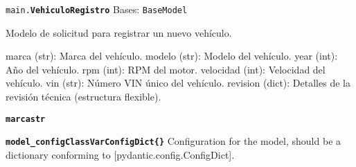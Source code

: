 \documentclass[a4paper,11pt,spanish]{sphinxmanual}
\newcommand{\robotoMonoBold}{\fontseries{b}\selectfont\ttfamily}
\renewcommand{\sphinxcode}[1]{\textcolor{sphinxorangeCode}{{\robotoMonoBold #1}}}
\renewcommand{\sphinxbfcode}[1]{\textbf{\sphinxcode{#1}}}
\renewcommand{\sphinxupquote}[1]{\texttt{#1}}
\begin{document}

\begin{fulllineitems}
\label{\detokenize{modelos:main.VehiculoRegistro}}
\pysigstartsignatures
\pysiglinewithargsret
{\sphinxbfcode{\sphinxupquote{}}\sphinxcode{\sphinxupquote{main.}}\sphinxbfcode{\sphinxupquote{VehiculoRegistro}}}
{\sphinxparamcomma {}\sphinxparamcomma {}\sphinxparamcomma {}\sphinxparamcomma {}\sphinxparamcomma {}\sphinxparamcomma {}\sphinxparamcomma {}}
{}
\pysigstopsignatures
\sphinxAtStartPar
Bases: \sphinxcode{\sphinxupquote{BaseModel}}

\sphinxAtStartPar
Modelo de solicitud para registrar un nuevo vehículo.
\begin{description}
\sphinxAtStartPar
marca (str): Marca del vehículo.
modelo (str): Modelo del vehículo.
year (int): Año del vehículo.
rpm (int): RPM del motor.
velocidad (int): Velocidad del vehículo.
vin (str): Número VIN único del vehículo.
revision (dict): Detalles de la revisión técnica (estructura flexible).

\end{description}

\begin{fulllineitems}
\label{\detokenize{modelos:main.VehiculoRegistro.marca}}
\pysigstartsignatures
\pysigline
{\sphinxbfcode{\sphinxupquote{marca}}\sphinxbfcode{\sphinxupquote{str}}}
\pysigstopsignatures
\end{fulllineitems}


\begin{fulllineitems}
\label{\detokenize{modelos:main.VehiculoRegistro.model_config}}
\pysigstartsignatures
\pysigline
{\sphinxbfcode{\sphinxupquote{model\_config}}\sphinxbfcode{\sphinxupquote{ClassVar\DUrole{p}{{[}}ConfigDict\DUrole{p}{{]}}}}\sphinxbfcode{\sphinxupquote{\DUrole{w}{ }\{\}}}}
\pysigstopsignatures
\sphinxAtStartPar
Configuration for the model, should be a dictionary conforming to {[}\sphinxtitleref{ConfigDict}{]}{[}pydantic.config.ConfigDict{]}.


\end{fulllineitems}
\end{fulllineitems}
\end{document}
